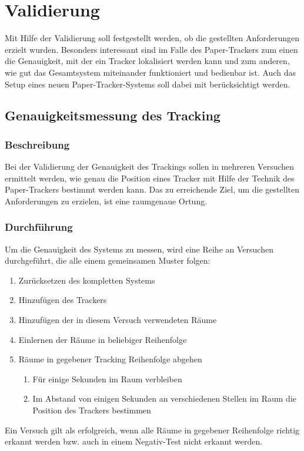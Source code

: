\chapter{Validierung}
Mit Hilfe der Validierung soll festgestellt werden, ob die gestellten Anforderungen erzielt wurden.
Besonders interessant sind im Falle des Paper-Trackers zum einen die Genauigkeit, mit der ein Tracker lokalisiert werden
kann und zum anderen, wie gut das Gesamtsystem miteinander funktioniert und bedienbar ist.
Auch das Setup eines neuen Paper-Tracker-Systems soll dabei mit berücksichtigt werden.

\section{Genauigkeitsmessung des Tracking}
\subsection{Beschreibung}
Bei der Validierung der Genauigkeit des Trackings sollen in mehreren Versuchen ermittelt werden, wie genau die Position
eines Tracker mit Hilfe der Technik des Paper-Trackers bestimmt werden kann.
Das zu erreichende Ziel, um die gestellten Anforderungen zu erzielen, ist eine raumgenaue Ortung.

\subsection{Durchführung}
Um die Genauigkeit des Systems zu messen, wird eine Reihe an Versuchen durchgeführt, die alle einem gemeinsamen Muster folgen:
\begin{enumerate}
	\item Zurücksetzen des kompletten Systems
	\item Hinzufügen des Trackers
	\item Hinzufügen der in diesem Versuch verwendeten Räume
	\item Einlernen der Räume in beliebiger Reihenfolge
	\item Räume in gegebener Tracking Reihenfolge abgehen
	\begin{enumerate}
		\item Für einige Sekunden im Raum verbleiben
		\item Im Abstand von einigen Sekunden an verschiedenen Stellen im Raum die Position des Trackers bestimmen
	\end{enumerate}
\end{enumerate}
Ein Versuch gilt als erfolgreich, wenn alle Räume in gegebener Reihenfolge richtig erkannt werden bzw. auch in einem
Negativ-Test nicht erkannt werden.

